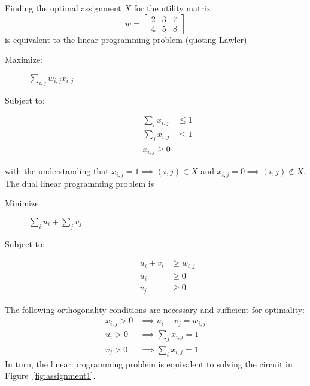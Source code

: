 \documentclass[12pt]{article}
\begin{document}
Finding the optimal assignment $X$ for the utility matrix
\begin{equation*}
  w =
  \begin{bmatrix}
    2 & 3 & 7 \\
    4 & 5 & 8
  \end{bmatrix}
\end{equation*}
is equivalent to the linear programming problem (quoting Lawler)
\begin{description}
\item[Maximize:] $\sum_{i,j} w_{i,j} x_{i,j}$
\item[Subject to:]
  \begin{align*}
    \sum_i x_{i,j} &\leq 1 \\
    \sum_j x_{i,j} &\leq 1 \\
    x_{i,j} \geq 0
  \end{align*}
\end{description}
with the understanding that $x_{i,j} = 1 \implies (i,j)\in X$ and
$x_{i,j} = 0 \implies (i,j)\notin X$.
The dual linear programming problem is
\begin{description}
\item[Minimize] $\sum_i u_i + \sum_j v_j$
\item[Subject to:]
  \begin{align*}
    u_i + v_i &\geq w_{i,j} \\
    u_i & \geq 0 \\
    v_j & \geq 0
  \end{align*}
\end{description}
The following orthogonality conditions are necessary and sufficient
for optimality:
\begin{align*}
  x_{i,j} > 0 & \implies u_i + v_j = w_{i,j}\\
  u_i > 0 & \implies \sum_j x_{i,j} = 1\\
  v_j > 0 & \implies \sum_i x_{i,j} = 1
\end{align*}
In turn, the linear programming problem is equivalent to solving the
circuit in Figure~\ref{fig:assignment1}.
\begin{figure*}
  \centering
  \caption{Circuit equivalent of assignment problem}
  \label{fig:assignment1}
\end{figure*}
\end{document}
